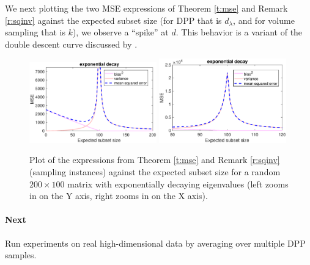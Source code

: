 \documentclass[12pt]{sty/colt2019/colt2018-arxiv}
\begin{document}
We next plotting the two MSE expressions of Theorem \ref{t:mse} and
Remark \ref{r:sqinv} against the expected subset size
(for DPP that is $d_\lambda$, and for volume sampling that is $k$), we
observe a ``spike'' at $d$. This behavior is a variant of the double
descent curve discussed by \cite{belkin2019two}.
\begin{figure}[H]
  \centering
  \includegraphics[width=0.49\textwidth]{figs/double-descent-primal}
    \includegraphics[width=0.49\textwidth]{figs/double-descent-primal-peak}
  \caption{Plot of the expressions from Theorem \ref{t:mse} and Remark
    \ref{r:sqinv} (sampling instances) against
    the expected subset size for a random $200\times 100$ matrix with
    exponentially decaying eigenvalues (left zooms in on the
    Y axis, right zooms in on the X axis).} 
\end{figure}
\paragraph{Next} Run experiments on real high-dimensional data by
averaging over multiple DPP samples.
\end{document}
